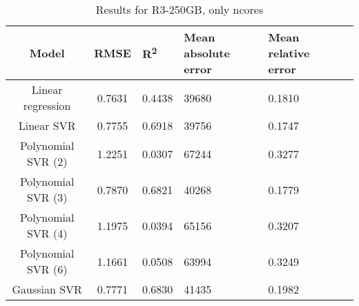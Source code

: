 \begin{table}[H]
\centering
\begin{adjustbox}{center}
\begin{tabular}{c | c M{1.2cm} M{2.5cm} M{2.5cm} M{1.8cm}}
Model & RMSE & R\textsuperscript{2} & Mean absolute error & Mean relative error \tabularnewline
\hline
Linear regression & 0.7631 & 0.4438 &  39680 & 0.1810 \\
Linear SVR & 0.7755 & 0.6918 &  39756 & 0.1747 \\
Polynomial SVR (2) & 1.2251 & 0.0307 &  67244 & 0.3277 \\
Polynomial SVR (3) & 0.7870 & 0.6821 &  40268 & 0.1779 \\
Polynomial SVR (4) & 1.1975 & 0.0394 &  65156 & 0.3207 \\
Polynomial SVR (6) & 1.1661 & 0.0508 &  63994 & 0.3249 \\
Gaussian SVR & 0.7771 & 0.6830 &  41435 & 0.1982 \\
\end{tabular}
\end{adjustbox}
\\
\caption{Results for R3-250GB, only ncores}
\label{tab:only_1_linear_R3_250}
\end{table}
